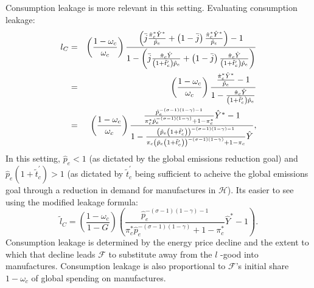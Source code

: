 \documentclass[notitlepage,12pt]{article}
\begin{document}
Consumption leakage is more relevant in this setting. Evaluating consumption
leakage:%
\begin{eqnarray*}
l_{C} &=&\left( \frac{1-\omega _{c}}{\omega _{c}}\right) \frac{\left( \bar{j}%
\frac{\hat{\pi}_{c}^{\ast }\hat{Y}^{\ast }}{\hat{p}_{e}}+\left( 1-\bar{j}%
\right) \frac{\hat{\pi}_{c}^{\ast }\hat{Y}^{\ast }}{\hat{p}_{e}}\right) -1}{%
1-\left( \bar{j}\frac{\hat{\pi}_{c}\hat{Y}}{\left( 1+\tilde{t}_{c}^{\prime
}\right) \hat{p}_{e}}+\left( 1-\bar{j}\right) \frac{\hat{\pi}_{c}\hat{Y}}{%
\left( 1+\tilde{t}_{c}^{\prime }\right) \hat{p}_{e}}\right) } \\
&=&\left( \frac{1-\omega _{c}}{\omega _{c}}\right) \frac{\frac{\hat{\pi}%
_{c}^{\ast }\hat{Y}^{\ast }}{\hat{p}_{e}}-1}{1-\frac{\hat{\pi}_{c}\hat{Y}}{%
\left( 1+\tilde{t}_{c}^{\prime }\right) \hat{p}_{e}}} \\
&=&\left( \frac{1-\omega _{c}}{\omega _{c}}\right) \frac{\frac{\hat{p}%
_{e}^{-\left( \sigma -1\right) \left( 1-\gamma \right) -1}}{\pi _{c}^{\ast }%
\hat{p}_{e}^{-\left( \sigma -1\right) \left( 1-\gamma \right) }+1-\pi
_{c}^{\ast }}\hat{Y}^{\ast }-1}{1-\frac{\left( \hat{p}_{e}\left( 1+\tilde{t}%
_{c}^{\prime }\right) \right) ^{-\left( \sigma -1\right) \left( 1-\gamma
\right) -1}}{\pi _{c}\left( \hat{p}_{e}\left( 1+\tilde{t}_{c}^{\prime
}\right) \right) ^{-\left( \sigma -1\right) \left( 1-\gamma \right) }+1-\pi
_{c}}\hat{Y}},
\end{eqnarray*}%
In this setting, $\hat{p}_{e}<1$ (as dictated by the global emissions
reduction goal) and $\hat{p}_{e}\left( 1+\tilde{t}_{c}^{\prime }\right) >1$
(as dictated by $\tilde{t}_{c}^{\prime }$ being sufficient to acheive the
global emissions goal through a reduction in demand for manufactures in $%
\mathcal{H}$). Its easier to see using the modified leakage formula:%
\begin{equation*}
\tilde{l}_{C}=\left( \frac{1-\omega _{c}}{1-G}\right) \left( \frac{\hat{p}%
_{e}^{-\left( \sigma -1\right) \left( 1-\gamma \right) -1}}{\pi _{c}^{\ast }%
\hat{p}_{e}^{-\left( \sigma -1\right) \left( 1-\gamma \right) }+1-\pi
_{c}^{\ast }}\hat{Y}^{\ast }-1\right) .
\end{equation*}%
Consumption leakage is determined by the energy price decline and the extent
to which that decline leads $\mathcal{F}$ to substitute away from the $l$%
-good into manufactures. Consumption leakage is also proportional to $%
\mathcal{F}$'s initial share $1-\omega _{c}$ of global spending on
manufactures.
\end{document}
